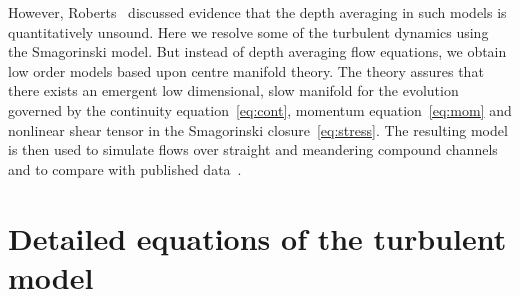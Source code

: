 \documentclass[a5paper,12pt]{article}
\begin{document}
However, Roberts~\cite{Roberts1996} discussed evidence that the depth averaging in such models is quantitatively unsound.
Here we resolve some of the turbulent dynamics using the Smagorinski model.
But instead of depth averaging flow equations, we obtain low order models based upon centre manifold theory. 
The theory assures that there exists an emergent low dimensional, slow manifold for the evolution governed by the continuity equation~\eqref{eq:cont}, momentum equation~\eqref{eq:mom} and nonlinear shear tensor in the Smagorinski closure~\eqref{eq:stress}.
The resulting model is then used to simulate flows over straight and meandering compound channels and to compare with published data~\cite[e.g.]{Bousmar2002, Liu2009}.


\section{Detailed equations of the turbulent model}
\end{document}
